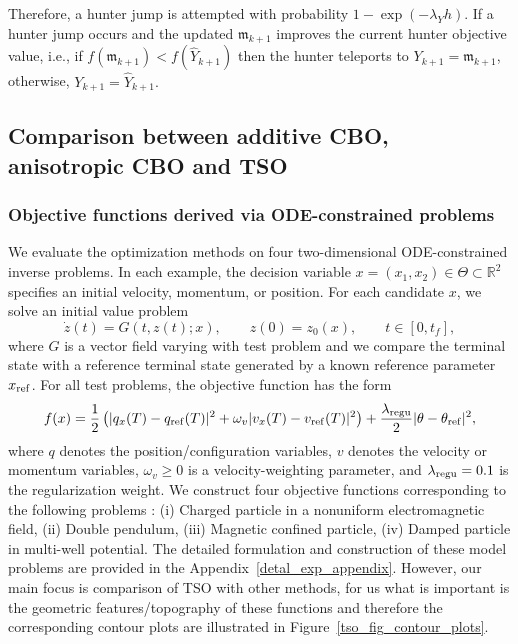 \documentclass{article}
\def\m{\mathfrak{m}}
\numberwithin{equation}{section}
\begin{document}
Therefore, a hunter jump is attempted with probability $  1-\exp(-\lambda_Y h)$. If a hunter jump occurs and the updated $\m_{k+1}$ improves the current hunter objective value, i.e., if $f(\m_{k+1}) < f(\hat{Y}_{k+1})$ then the hunter teleports to $Y_{k+1}
    =  \m_{k+1}$, otherwise, $
    Y_{k+1}
    =
    \hat{Y}_{k+1}.$


\subsection{Comparison between additive CBO, anisotropic CBO and TSO}\label{comp_sec_cb_tso}
\subsubsection{Objective functions derived via ODE-constrained problems} 
We evaluate the optimization methods on four two-dimensional
ODE-constrained inverse problems. In each example, the decision variable $    x=(x_1,x_2)\in\Theta\subset\mathbb R^2$
specifies an initial velocity, momentum, or position. For each candidate
$x$, we solve an initial value problem
\begin{equation}\label{tso_eqn_new_6.4}
    \dot z(t)=G(t,z(t);x),\qquad z(0)=z_0(x),
    \qquad t\in[0,t_f],
\end{equation}
where $G$ is a vector field varying with test problem and we compare the terminal state with a reference terminal state generated by a
known reference parameter $x_{\rm ref}$. For all test problems, the objective function has the form
\begin{align}\label{tso_eqn_new_6.5}
    f(x)=
    \frac12\left(
        |q_x(T)-q_{\rm ref}(T)|^2
        +
        \omega_v|v_x(T)-v_{\rm ref}(T)|^2
    \right) +\frac{\lambda_{\rm regu}}{2}
    |\theta-\theta_{\rm ref}|^2,
\end{align}
where $q$ denotes the position/configuration variables, $v$ denotes the
velocity or momentum variables, $\omega_v\ge0$ is a velocity-weighting
parameter, and $\lambda_{\rm regu}=0.1$ is the regularization weight.
We construct four objective functions corresponding to the following problems : (i)
Charged particle in a nonuniform electromagnetic field, (ii) Double pendulum, (iii) Magnetic confined particle, (iv) Damped particle in multi-well potential. The detailed formulation and construction of these model problems are provided in the Appendix~\ref{detal_exp_appendix}. However, our main focus is comparison of TSO with other methods, for us what is important is the geometric features/topography of these functions and therefore the corresponding contour plots are illustrated in Figure~\ref{tso_fig_contour_plots}. 
\end{document}
